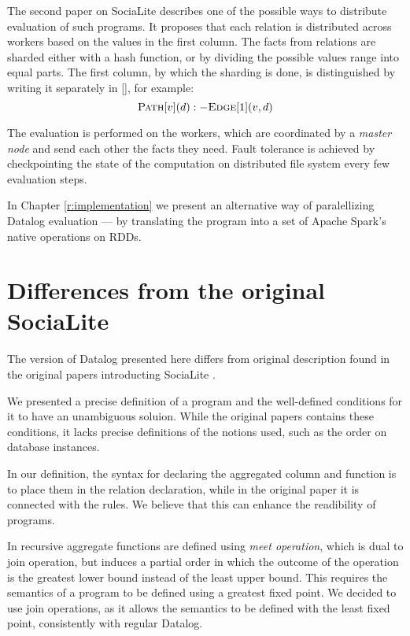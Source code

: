 The second paper on SociaLite \cite{distsoc} describes one of the possible ways to distribute evaluation of such programs. It proposes that each relation is distributed across workers based on the values in the first column. The facts from relations are sharded either with a hash function, or by dividing the possible values range into equal parts. The first column, by which the sharding is done, is distinguished by writing it separately in [], for example:
$$\textsc{Path}[v](d) :- \textsc{Edge}[1](v, d)$$

The evaluation is performed on the workers, which are coordinated by a \emph{master node} and send each other the facts they need. Fault tolerance is achieved by checkpointing the state of the computation on distributed file system every few evaluation steps.

In Chapter \ref{r:implementation} we present an alternative way of paralellizing Datalog evaluation --- by translating the program into a set of Apache Spark's native operations on RDDs.


\section{Differences from the original SociaLite}

The version of Datalog presented here differs from original description found in the original papers introducting SociaLite \cite{socialite, distsoc}.

We presented a precise definition of a \datalogra program and the well-defined conditions for it to have an unambiguous soluion. While the original papers contains these conditions, it lacks precise definitions of the notions used, such as the order on database instances.

In our definition, the syntax for declaring the aggregated column and function is to place them in the relation declaration, while in the original paper it is connected with the rules. We believe that this can enhance the readibility of \datalogra programs.

In \cite{socialite, distsoc} recursive aggregate functions are defined using \emph{meet operation}, which is dual to join operation, but induces a partial order in which the outcome of the operation is the greatest lower bound instead of the least upper bound. This requires the semantics of a program to be defined using a greatest fixed point. We decided to use join operations, as it allows the semantics to be defined with the least fixed point, consistently with regular Datalog.
